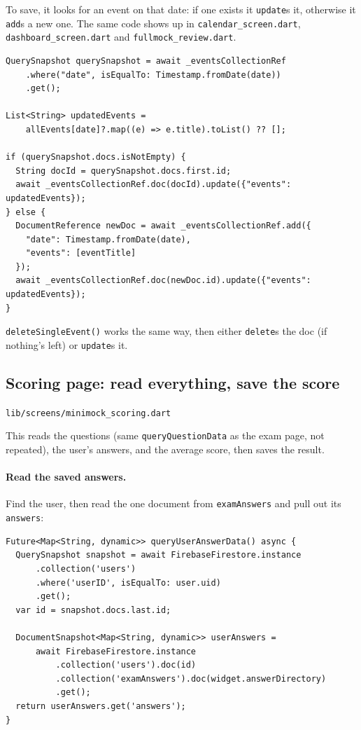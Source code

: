\documentclass[11pt,a4paper]{article}
\newcommand{\file}[1]{\texttt{\small #1}}
\begin{document}
\noindent To save, it looks for an event on that date: if one exists it
\verb|update|s it, otherwise it \verb|add|s a new one. The same code shows up in
\file{calendar\_screen.dart}, \file{dashboard\_screen.dart} and
\file{fullmock\_review.dart}.

\begin{lstlisting}
QuerySnapshot querySnapshot = await _eventsCollectionRef
    .where("date", isEqualTo: Timestamp.fromDate(date))
    .get();

List<String> updatedEvents =
    allEvents[date]?.map((e) => e.title).toList() ?? [];

if (querySnapshot.docs.isNotEmpty) {
  String docId = querySnapshot.docs.first.id;
  await _eventsCollectionRef.doc(docId).update({"events": updatedEvents});
} else {
  DocumentReference newDoc = await _eventsCollectionRef.add({
    "date": Timestamp.fromDate(date),
    "events": [eventTitle]
  });
  await _eventsCollectionRef.doc(newDoc.id).update({"events": updatedEvents});
}
\end{lstlisting}

\noindent \verb|deleteSingleEvent()| works the same way, then either
\verb|delete|s the doc (if nothing's left) or \verb|update|s it.

\subsection{Scoring page: read everything, save the score}
\file{lib/screens/minimock\_scoring.dart}

This reads the questions (same \verb|queryQuestionData| as the exam page, not
repeated), the user's answers, and the average score, then saves the result.

\paragraph{Read the saved answers.} Find the user, then read the one document
from \texttt{examAnswers} and pull out its \verb|answers|:

\begin{lstlisting}
Future<Map<String, dynamic>> queryUserAnswerData() async {
  QuerySnapshot snapshot = await FirebaseFirestore.instance
      .collection('users')
      .where('userID', isEqualTo: user.uid)
      .get();
  var id = snapshot.docs.last.id;

  DocumentSnapshot<Map<String, dynamic>> userAnswers =
      await FirebaseFirestore.instance
          .collection('users').doc(id)
          .collection('examAnswers').doc(widget.answerDirectory)
          .get();
  return userAnswers.get('answers');
}
\end{lstlisting}
\end{document}
